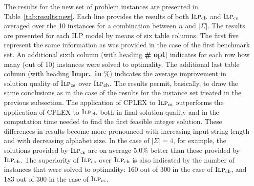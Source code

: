 \documentclass[11pt,a4paper]{article}
\newcommand{\MIPorig}{\textsc{Ilp}_{\mathrm{cb}}}
\newcommand{\MIPalt}{\textsc{Ilp}_{\mathrm{cs}}}
\begin{document}
The results for the new set of problem instances are presented in
Table~\ref{tab:results:new}. Each line provides the results of both
$\MIPorig$ and $\MIPalt$ averaged over the 10 instances for a
combination between $n$ and $|\Sigma|$. The results are presented for
each ILP model by means of six table columns. The first five represent the
same information as was provided in the case of the first benchmark set.
An additional sixth column (with heading {\bf \# opt}) indicates for
each row how many (out of 10) instances were solved to optimality.
The additional last table column (with heading {\bf Impr.~in $\%$})
indicates the average improvement in solution quality of $\MIPalt$ over
$\MIPorig$. The results permit, basically, to draw the same conclusions
as in the case of the results for the instance set treated in the
previous subsection. The application of CPLEX to $\MIPalt$ outperforms
the application of CPLEX to $\MIPorig$ both in final solution quality
and in the computation time needed to find the first feasible integer
solution. These differences in results become more pronounced with
increasing input string length and with decreasing alphabet size. In the
case of $|\Sigma|=4$, for example, the solutions provided by $\MIPalt$
are on average $5.0\%$ better than those provided by $\MIPorig$. The
superiority of $\MIPalt$ over $\MIPorig$ is also indicated by the number
of instances that were solved to optimality: 160 out of 300 in the case
of $\MIPorig$, and 183 out of 300 in the case of $\MIPalt$.
\end{document}
